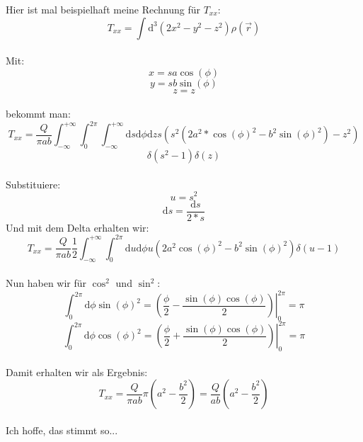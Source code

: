 \documentclass{beamer}
\begin{document}
Hier ist mal beispielhaft meine Rechnung für \(T_{xx}\):\\
\[T_{xx} = \int \mathrm{d}^{3} (2x^{2}-y^{2}-z^{2})\rho(\overrightarrow{r})\]\\
Mit:\\
\[x = s a \cos(\phi)\]
\[y = s b \sin(\phi)\]
\[z = z\]\\
bekommt man:\\
\[T_{xx} = \frac{Q}{\pi a b} \int_{-\infty}^{+\infty}\int_{0}^{2\pi}\int_{-\infty}^{+\infty} \mathrm{d}s \mathrm{d}\phi \mathrm{d}z s (s^{2} (2 a^{2}*\cos(\phi)^{2}-b^{2} \sin(\phi)^{2}) - z^{2})\]
\[\delta(s^{2}-1) \delta(z)\]\\
Substituiere:\\
\[u = s^{2}\]
\[\mathrm{d}s = \frac{\mathrm{d}s}{2*s}\]
Und mit dem Delta erhalten wir:\\
\[T_{xx} = \frac{Q}{\pi a b}\frac{1}{2}\int_{-\infty}^{+\infty}\int_{0}^{2\pi} \mathrm{d}u \mathrm{d}\phi u (2 a^{2} \cos(\phi)^{2} - b^{2} \sin(\phi)^{2})\delta(u-1)\]\\
Nun haben wir für $\cos^{2}$ und $\sin^{2}$:
\[\int_{0}^{2 \pi} \mathrm{d}\phi \sin(\phi)^{2} = \left.\left(\frac{\phi}{2}-\frac{\sin(\phi) \cos(\phi)}{2}\right)\right|_0^{2\pi} = \pi\]
\[\int_{0}^{2 \pi} \mathrm{d}\phi \cos(\phi)^{2} = \left.\left(\frac{\phi}{2}+\frac{\sin(\phi) \cos(\phi)}{2}\right)\right|_0^{2\pi} = \pi\]\\
Damit erhalten wir als Ergebnis:\\
\[T_{xx} = \frac{Q}{\pi a b} \pi (a^{2}-\frac{b^{2}}{2}) = \frac{Q}{a b} (a^{2}-\frac{b^{2}}{2})\]\\
Ich hoffe, das stimmt so...\\
\end{document}
